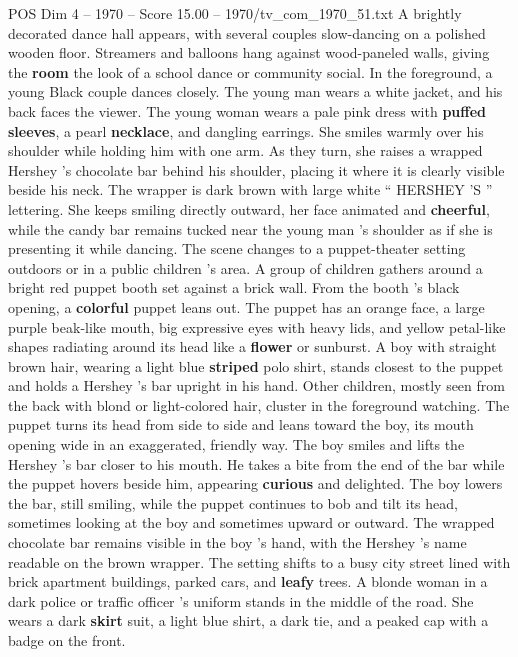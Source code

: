 \begin{textsample}{POS Dim 4 – 1970 – Score 15.00 – 1970/tv\_com\_1970\_51.txt}  \label{ex:f4_pos_084}
A brightly decorated dance hall appears, with several couples slow-dancing on a polished wooden floor.
Streamers and balloons hang against wood-paneled walls, giving the \textbf{room} the look of a school dance or community social.
In the foreground, a young Black couple dances closely.
The young man wears a white jacket, and his back faces the viewer.
The young woman wears a pale pink dress with \textbf{puffed} \textbf{sleeves}, a pearl \textbf{necklace}, and dangling earrings.
She smiles warmly over his shoulder while holding him with one arm.
As they turn, she raises a wrapped Hershey ’s chocolate bar behind his shoulder, placing it where it is clearly visible beside his neck.
The wrapper is dark brown with large white “ HERSHEY ’S ” lettering.
She keeps smiling directly outward, her face animated and \textbf{cheerful}, while the candy bar remains tucked near the young man ’s shoulder as if she is presenting it while dancing.
The scene changes to a puppet-theater setting outdoors or in a public children ’s area.
A group of children gathers around a bright red puppet booth set against a brick wall.
From the booth ’s black opening, a \textbf{colorful} puppet leans out.
The puppet has an orange face, a large purple beak-like mouth, big expressive eyes with heavy lids, and yellow petal-like shapes radiating around its head like a \textbf{flower} or sunburst.
A boy with straight brown hair, wearing a light blue \textbf{striped} polo shirt, stands closest to the puppet and holds a Hershey ’s bar upright in his hand.
Other children, mostly seen from the back with blond or light-colored hair, cluster in the foreground watching.
The puppet turns its head from side to side and leans toward the boy, its mouth opening wide in an exaggerated, friendly way.
The boy smiles and lifts the Hershey ’s bar closer to his mouth.
He takes a bite from the end of the bar while the puppet hovers beside him, appearing \textbf{curious} and delighted.
The boy lowers the bar, still smiling, while the puppet continues to bob and tilt its head, sometimes looking at the boy and sometimes upward or outward.
The wrapped chocolate bar remains visible in the boy ’s hand, with the Hershey ’s name readable on the brown wrapper.
The setting shifts to a busy city street lined with brick apartment buildings, parked cars, and \textbf{leafy} trees.
A blonde woman in a dark police or traffic officer ’s uniform stands in the middle of the road.
She wears a dark \textbf{skirt} suit, a light blue shirt, a dark tie, and a peaked cap with a badge on the front.

\end{textsample}
